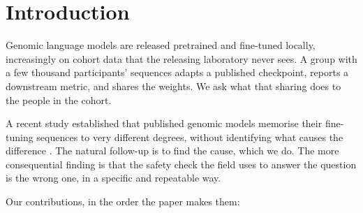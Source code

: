 \section{Introduction}
\label{sec:intro}

Genomic language models are released pretrained and fine-tuned locally, increasingly on cohort data
that the releasing laboratory never sees. A group with a few thousand participants' sequences adapts
a published checkpoint, reports a downstream metric, and shares the weights. We ask what that
sharing does to the people in the cohort.

A recent study established that published genomic models memorise their fine-tuning sequences to
very different degrees, without identifying what causes the difference
\citep{nemecek2026quantifying}. The natural follow-up is to find the cause, which we do. The more
consequential finding is that the safety check the field uses to answer the question is the wrong
one, in a specific and repeatable way.

Our contributions, in the order the paper makes them:

